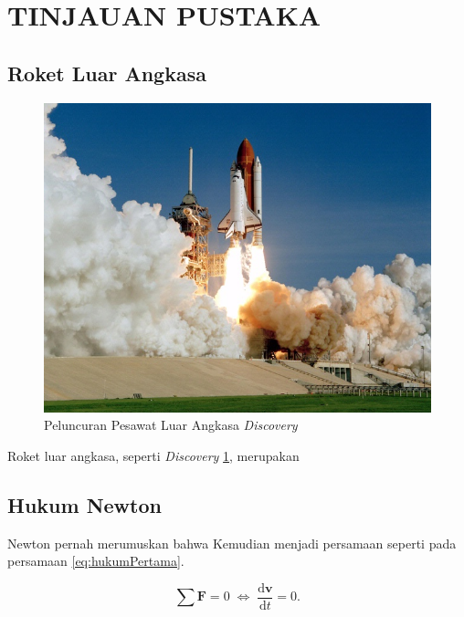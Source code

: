 \section{TINJAUAN PUSTAKA}


\subsection{Roket Luar Angkasa}

\begin{figure} [ht] \centering
  \includegraphics[scale=0.45]{gambar/space-shuttle.jpg}
  \caption{Peluncuran Pesawat Luar Angkasa \emph{Discovery}}
  \label{fig:spaceShuttle}
\end{figure}

Roket luar angkasa, seperti \emph{Discovery} \ref{fig:spaceShuttle}, merupakan \lipsum[2]

\subsection{Hukum Newton}

Newton pernah merumuskan \citep{newtonLaw} bahwa \lipsum[2]
Kemudian menjadi persamaan seperti pada persamaan \ref{eq:hukumPertama}.

\begin{equation}
  \label{eq:hukumPertama}
  \sum \mathbf{F} = 0\; \Leftrightarrow\; \frac{\mathrm{d} \mathbf{v} }{\mathrm{d}t} = 0.
\end{equation}